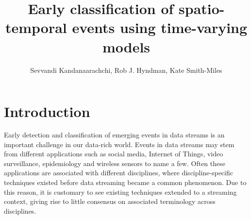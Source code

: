 \documentclass[11pt]{article}
\begin{document}
	\title{Early classification of spatio-temporal events using time-varying models}
	\author{Sevvandi Kandanaarachchi, Rob J. Hyndman, Kate Smith-Miles}
	\maketitle
	

	



	\section{Introduction}
	
	Early detection and classification of emerging events in data streams is an important challenge in our data-rich world. Events in data streams may stem from different applications such as social media, Internet of Things, video surveillance, epidemiology and wireless sensors to name a few. Often these applications are associated with different disciplines, where discipline-specific techniques existed before data streaming became a common phenomenon. Due to this reason, it is customary to see existing techniques extended to a streaming context, giving rise to little consensus on associated terminology across disciplines.  
	
\end{document}
